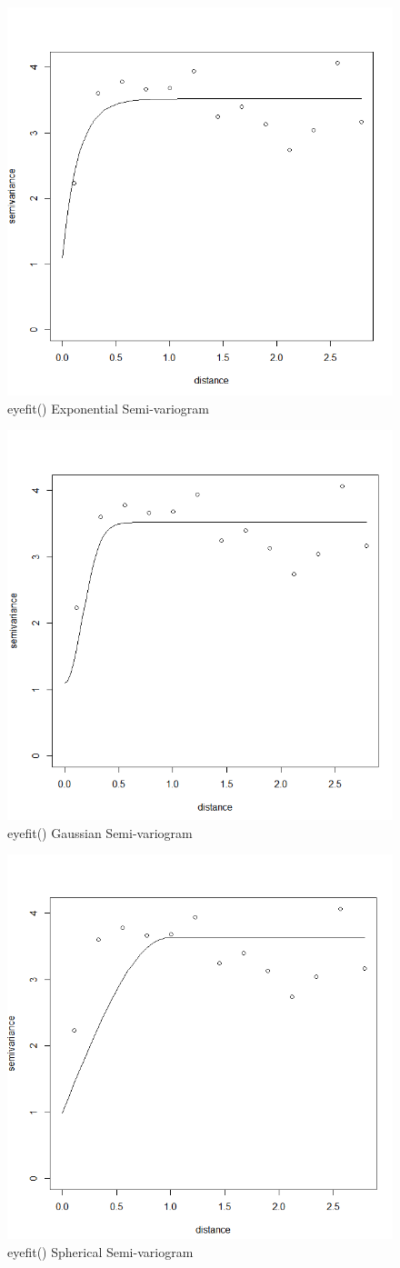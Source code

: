 \documentclass[12pt]{article}
\makeatletter
\theoremstyle{homework}
\newenvironment{exercise}[1]
{\def\@currentlabel{#1}\exercisecore}
{\endexercisecore}
\makeatother
\begin{document}
\begin{exercise}{4}
\begin{enumerate}
  \begin{figure}[H]
    \begin{center}
      \caption{eyefit() Exponential Semi-variogram}
    \includegraphics[width = .60\textwidth]{Exponential.png}
    \end{center}
  \end{figure}
  \begin{figure}[H]
    \begin{center}
      \caption{eyefit() Gaussian Semi-variogram}
    \includegraphics[width = .60\textwidth]{Gaussian.png}
    \end{center}
  \end{figure}
  \begin{figure}[H]
    \begin{center}
      \caption{eyefit() Spherical Semi-variogram}
    \includegraphics[width = .60\textwidth]{Spherical.png}

\end{center}
\end{figure}
\end{enumerate}
\end{exercise}
\end{document}
